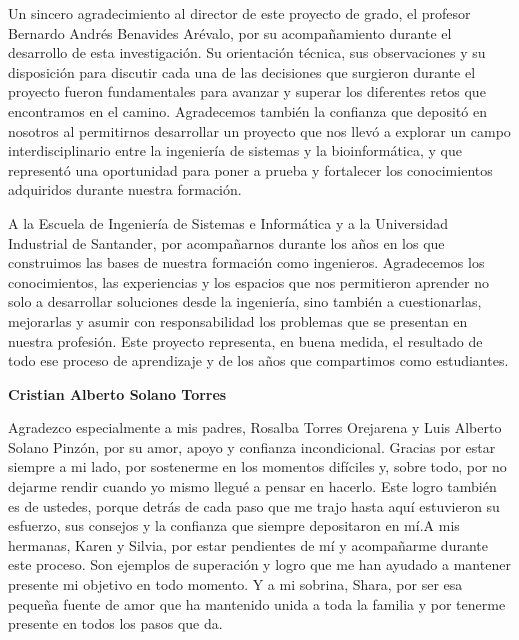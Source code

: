 \documentclass[12pt,oneside,spanish]{book}
\begin{document}
    \vspace{1cm}
    
    Un sincero agradecimiento al director de este proyecto de grado, el profesor Bernardo Andrés Benavides Arévalo, por su acompañamiento durante el desarrollo de esta investigación. Su orientación técnica, sus observaciones y su disposición para discutir cada una de las decisiones que surgieron durante el proyecto fueron fundamentales para avanzar y superar los diferentes retos que encontramos en el camino. Agradecemos también la confianza que depositó en nosotros al permitirnos desarrollar un proyecto que nos llevó a explorar un campo interdisciplinario entre la ingeniería de sistemas y la bioinformática, y que representó una oportunidad para poner a prueba y fortalecer los conocimientos adquiridos durante nuestra formación.
    
    A la Escuela de Ingeniería de Sistemas e Informática y a la Universidad Industrial de Santander, por acompañarnos durante los años en los que construimos las bases de nuestra formación como ingenieros. Agradecemos los conocimientos, las experiencias y los espacios que nos permitieron aprender no solo a desarrollar soluciones desde la ingeniería, sino también a cuestionarlas, mejorarlas y asumir con responsabilidad los problemas que se presentan en nuestra profesión. Este proyecto representa, en buena medida, el resultado de todo ese proceso de aprendizaje y de los años que compartimos como estudiantes.
    
    \vspace{0.5cm}
    
    \noindent\textbf{Cristian Alberto Solano Torres}
    
    Agradezco especialmente a mis padres, Rosalba Torres Orejarena y Luis Alberto Solano Pinzón, por su amor, apoyo y confianza incondicional. Gracias por estar siempre a mi lado, por sostenerme en los momentos difíciles y, sobre todo, por no dejarme rendir cuando yo mismo llegué a pensar en hacerlo. Este logro también es de ustedes, porque detrás de cada paso que me trajo hasta aquí estuvieron su esfuerzo, sus consejos y la confianza que siempre depositaron en mí.A mis hermanas, Karen y Silvia, por estar pendientes de mí y acompañarme durante este proceso. Son ejemplos de superación y logro que me han ayudado a mantener presente mi objetivo en todo momento. Y a mi sobrina, Shara, por ser esa pequeña fuente de amor que ha mantenido unida a toda la familia y por tenerme presente en todos los pasos que da.
    
\end{document}
